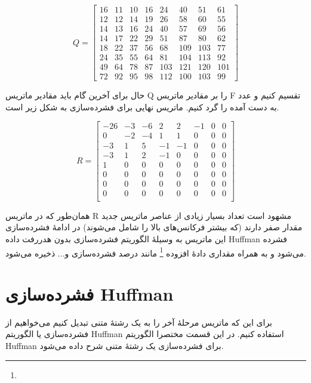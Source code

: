 \[
        Q = \begin{bmatrix}
                16 & 11 & 10 & 16 & 24 & 40 & 51 & 61\\
                12 & 12 & 14 & 19 & 26 & 58 & 60 & 55 \\
                14 & 13 & 16 & 24 & 40 & 57 & 69 & 56 \\
                14 & 17 & 22 & 29 & 51 & 87 & 80 & 62 \\
                18 & 22 & 37 & 56 & 68 & 109 & 103 & 77 \\
                24 & 35 & 55 & 64 & 81 & 104 & 113 & 92 \\
                49 & 64 & 78 & 87 & 103 & 121 & 120 & 101 \\
                72 & 92 & 95 & 98 & 112 & 100 & 103 & 99 

        \end{bmatrix}
\]

حال برای آخرین گام باید مقادیر ماتریس
Q 
را بر مقادیر ماتریس F 
تقسیم کنیم و عدد به دست آمده را گرد کنیم. ماتریس نهایی برای فشرده‌سازی به شکل زیر است.

\[
       R = \begin{bmatrix}
                -26 & -3 & -6 & 2 & 2 & -1 & 0 & 0\\
                0 & -2 & -4 & 1 & 1 & 0 & 0 & 0 \\
                -3 & 1 & 5 & -1 & -1 & 0 & 0 & 0 \\
                -3 & 1 & 2 & -1 & 0 & 0 & 0 & 0 \\
                1 & 0 & 0 & 0 & 0 & 0 & 0 & 0 \\
                0 & 0 & 0 & 0 & 0 & 0 & 0 & 0 \\
                0 & 0 & 0 & 0 & 0 & 0 & 0 & 0 \\
                0 & 0 & 0 & 0 & 0 & 0 & 0 & 0 \\

        \end{bmatrix}
\]

همان‌طور که در ماتریس R مشهود است تعداد بسیار زیادی از عناصر ماتریس جدید
مقدار صفر دارند (که بیشتر فرکانس‌های بالا را شامل می‌شوند)
در ادامهٔ فشرده‌سازی این ماتریس به وسیلهٔ الگوریتم فشرده‌‌سازی بدون هدررفت داده
Huffman 
فشرده می‌شود و به همراه مقداری 
دادهٔ افزوده 
\footnote{}
مانند درصد فشرده‌سازی و... ذخیره می‌شود. 

\section{فشرده‌سازی Huffman}
برای این که ماتریس مرحلهٔ آخر را به یک رشتهٔ متنی تبدیل کنیم می‌خواهیم از 
فشرده‌سازی یا الگوریتم Huffman استفاده کنیم.
در این قسمت مختصرا الگوریتم Huffman برای فشرده‌سازی یک رشتهٔ متنی شرح داده می‌شود.

